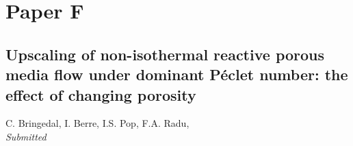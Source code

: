\chapter*{Paper F}
\section*{Upscaling of non-isothermal reactive porous media flow under dominant P\'{e}clet number: the effect of changing porosity}

\noindent C. Bringedal, I. Berre, I.S. Pop, F.A. Radu, \\

\noindent \textit{Submitted}%

\cleardoublepage





